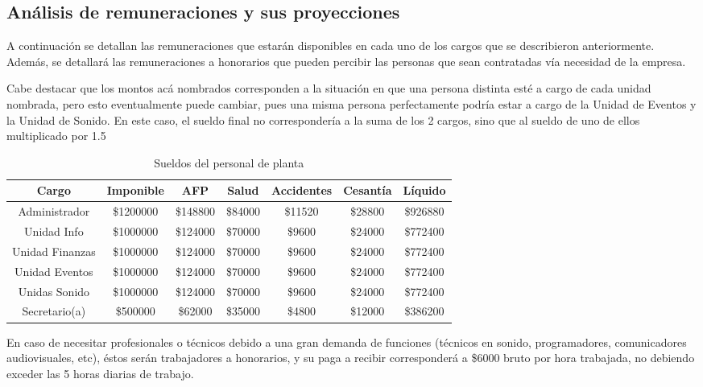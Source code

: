 \subsection{Análisis de remuneraciones y sus proyecciones}

A continuación se detallan las remuneraciones que estarán disponibles en cada uno de los cargos
que se describieron anteriormente. Además, se detallará las remuneraciones a honorarios que pueden percibir
las personas que sean contratadas vía necesidad de la empresa.

Cabe destacar que los montos acá nombrados corresponden a la situación en que una persona distinta
esté a cargo de cada unidad nombrada, pero esto eventualmente puede cambiar, pues una misma persona 
perfectamente podría estar a cargo de la Unidad de Eventos y la Unidad de Sonido. En este caso, el sueldo 
final no correspondería a la suma de los 2 cargos, sino que al sueldo de uno de ellos multiplicado por 1.5

\begin{table}[h]
\centering
\begin{tabular}{|c|c|c|c|c|c|c|} \hline
Cargo           & Imponible & AFP      & Salud   & Accidentes & Cesantía & Líquido  \\ \hline
Administrador   & \$1200000 & \$148800 & \$84000 & \$11520    & \$28800  & \$926880 \\ \hline
Unidad Info     & \$1000000 & \$124000 & \$70000 & \$9600     & \$24000  & \$772400 \\ \hline
Unidad Finanzas & \$1000000 & \$124000 & \$70000 & \$9600     & \$24000  & \$772400 \\ \hline
Unidad Eventos  & \$1000000 & \$124000 & \$70000 & \$9600     & \$24000  & \$772400 \\ \hline
Unidas Sonido   & \$1000000 & \$124000 & \$70000 & \$9600     & \$24000  & \$772400 \\ \hline
Secretario(a)   & \$500000  & \$62000  & \$35000 & \$4800     & \$12000  & \$386200 \\ \hline
\end{tabular}
\caption{Sueldos del personal de planta}
\end{table}
En caso de necesitar profesionales o técnicos debido a una gran demanda de funciones (técnicos 
en sonido, programadores, comunicadores audiovisuales, etc), éstos serán trabajadores a honorarios, 
y su paga a recibir corresponderá a \$6000 bruto por hora trabajada, no debiendo exceder las 5 horas diarias de trabajo.

